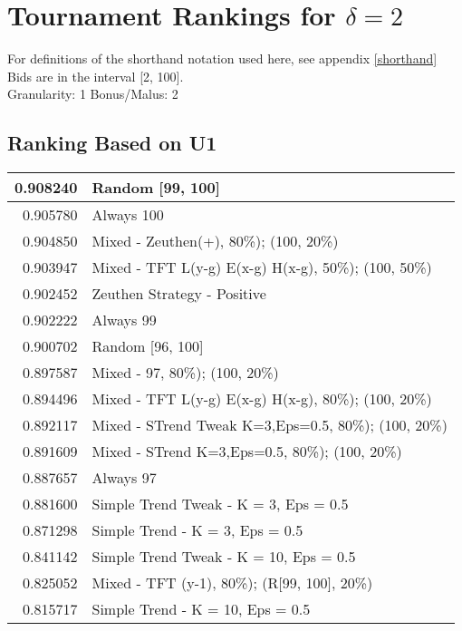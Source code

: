 \newpage  
\section{Tournament Rankings for $\delta = 2$}\label{results_2}
For definitions of the shorthand notation used here, see appendix \ref{shorthand} \\
\newline
Bids are in the interval [2, 100].\\
Granularity: 1\hspace{0.25in} Bonus/Malus: 2\\
\begin{table}[!hbtp]
\subsection{Ranking Based on U1}
\begin{footnotesize}
\begin{tabular}{|r|l|}\hline  \label{U3results}
0.908240 & Random [99, 100]\\ \hline
0.905780 & Always 100\\ \hline
0.904850 & Mixed - {Zeuthen(+), 80\%); (100, 20\%)}\\ \hline
0.903947 & Mixed - {TFT L(y-g) E(x-g) H(x-g), 50\%); (100, 50\%)}\\ \hline
0.902452 & Zeuthen Strategy - Positive\\ \hline
0.902222 & Always 99\\ \hline
0.900702 & Random [96, 100]\\ \hline
0.897587 & Mixed - {97, 80\%); (100, 20\%)}\\ \hline
0.894496 & Mixed - {TFT L(y-g) E(x-g) H(x-g), 80\%); (100, 20\%)}\\ \hline
0.892117 & Mixed - {STrend Tweak K=3,Eps=0.5, 80\%); (100, 20\%)}\\ \hline
0.891609 & Mixed - {STrend K=3,Eps=0.5, 80\%); (100, 20\%)}\\ \hline
0.887657 & Always 97\\ \hline
0.881600 & Simple Trend Tweak - K = 3, Eps = 0.5\\ \hline
0.871298 & Simple Trend - K = 3, Eps = 0.5\\ \hline
0.841142 & Simple Trend Tweak - K = 10, Eps = 0.5\\ \hline
0.825052 & Mixed - {TFT (y-1), 80\%); (R[99, 100], 20\%)}\\ \hline
0.815717 & Simple Trend - K = 10, Eps = 0.5\\ \hline

\end{tabular}
\end{footnotesize}
\end{table}

